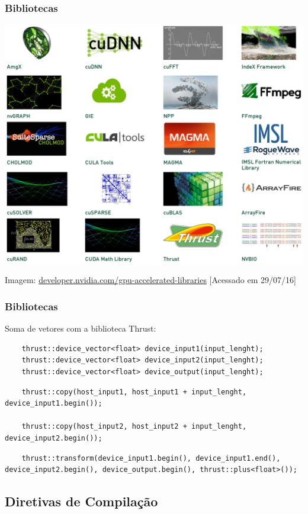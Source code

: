 \documentclass[10pt, compress]{beamer}
\begin{document}
\begin{frame}
    \frametitle{Bibliotecas}
    \centering
    \includegraphics[width=.9\textwidth]{accel_libs}
    \vfill

    \tiny{Imagem: \url{developer.nvidia.com/gpu-accelerated-libraries} [Acessado em 29/07/16]}
\end{frame}

\begin{frame}[fragile]
    \frametitle{Bibliotecas}
    Soma de vetores com a biblioteca \alert{Thrust}:
    \begin{lstlisting}
    thrust::device_vector<float> device_input1(input_lenght);
    thrust::device_vector<float> device_input2(input_lenght);
    thrust::device_vector<float> device_output(input_lenght);
    \end{lstlisting}
    \pause
    \begin{lstlisting}
    thrust::copy(host_input1, host_input1 + input_lenght, device_input1.begin());

    thrust::copy(host_input2, host_input2 + input_lenght, device_input2.begin());
    \end{lstlisting}
    \pause
    \begin{lstlisting}
    thrust::transform(device_input1.begin(), device_input1.end(), device_input2.begin(), device_output.begin(), thrust::plus<float>());
    \end{lstlisting}
\end{frame}

\subsection{Diretivas de Compilação}
\end{document}
